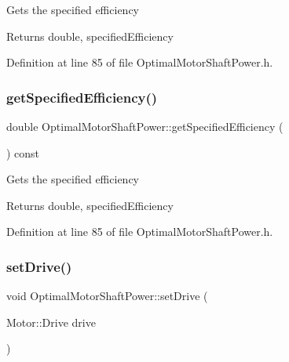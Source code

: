 Gets the specified efficiency \begin{DoxyReturn}{Returns}
double, specified\+Efficiency 
\end{DoxyReturn}


Definition at line 85 of file Optimal\+Motor\+Shaft\+Power.\+h.

\mbox{\label{class_optimal_motor_shaft_power_a89c2038dae30ef58245e810187c2a6c4}} 
\subsubsection{\texorpdfstring{get\+Specified\+Efficiency()}{getSpecifiedEfficiency()}\hspace{0.1cm}{\footnotesize\ttfamily [3/3]}}
{\footnotesize\ttfamily double Optimal\+Motor\+Shaft\+Power\+::get\+Specified\+Efficiency (\begin{DoxyParamCaption}{ }\end{DoxyParamCaption}) const\hspace{0.3cm}{\ttfamily [inline]}}

Gets the specified efficiency \begin{DoxyReturn}{Returns}
double, specified\+Efficiency 
\end{DoxyReturn}


Definition at line 85 of file Optimal\+Motor\+Shaft\+Power.\+h.

\mbox{\label{class_optimal_motor_shaft_power_a8f3288a69848c61f4e8e2b14da549d16}} 
\subsubsection{\texorpdfstring{set\+Drive()}{setDrive()}\hspace{0.1cm}{\footnotesize\ttfamily [1/3]}}
{\footnotesize\ttfamily void Optimal\+Motor\+Shaft\+Power\+::set\+Drive (\begin{DoxyParamCaption}\item[{Motor\+::\+Drive}]{drive }\end{DoxyParamCaption})\hspace{0.3cm}{\ttfamily [inline]}}

